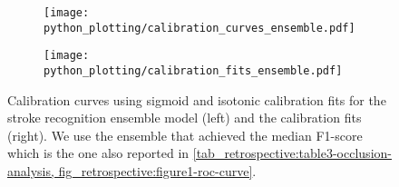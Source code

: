\begin{figure}
    \begin{subfigure}[c]{0.48\columnwidth}
        \centering
        \texttt{[image: python\_plotting/calibration\_curves\_ensemble.pdf]}
    \end{subfigure}
    \begin{subfigure}[c]{0.48\columnwidth}
        \centering
        \texttt{[image: python\_plotting/calibration\_fits\_ensemble.pdf]}
    \end{subfigure}
    \caption[Calibration fits and curves for the stroke recognition model using Platt-scaling and isotonic regression for calibration.]{%
        Calibration curves using sigmoid and isotonic calibration fits for the stroke recognition ensemble model (left) and the calibration fits (right). 
        We use the ensemble that achieved the median F1-score which is the one also reported in \cref{tab_retrospective:table3-occlusion-analysis, fig_retrospective:figure1-roc-curve}.
    }
    \label{fig_discussion:retrospective-paper-calibration-curve-sigmoid-isotonic}
\end{figure}










